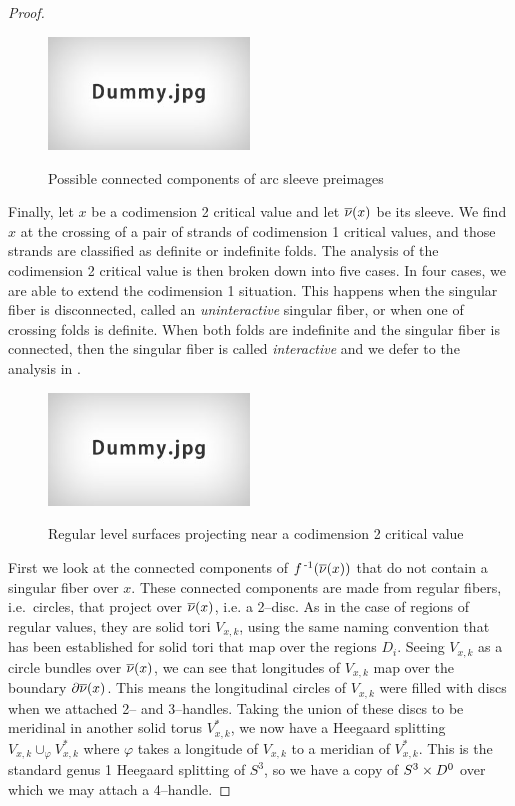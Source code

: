 \begin{proof}
	\begin{figure}
		\centering
		\captionsetup{justification=centering}
		\caption{Possible connected components of arc sleeve preimages}
		\includegraphics[height=3cm]{figures/dummy.jpg}
		\label{fig:arcsleevepre}
	\end{figure}
	
	Finally, let $x$ be a codimension 2 critical value and let $\overline{\nu}(x)$ be its sleeve.
	We find $x$ at the crossing of a pair of strands of codimension 1 critical values, and those strands are classified as definite or indefinite folds.
	The analysis of the codimension 2 critical value is then broken down into five cases.
	In four cases, we are able to extend the codimension 1 situation.
	This happens when the singular fiber is disconnected, called an \emph{uninteractive} singular fiber, or when one of crossing folds is definite.
	When both folds are indefinite and the singular fiber is connected, then the singular fiber is called \emph{interactive} and we defer to the analysis in \cite{CostThur08}.
	
	\begin{figure}
		\centering
		\captionsetup{justification=centering}
		\caption{Regular level surfaces projecting near a codimension 2 critical value}
		\includegraphics[height=3cm]{figures/dummy.jpg}
		\label{fig:regprojcodim2}
	\end{figure}
	
	First we look at the connected components of $f^{\,\text{-}1}(\overline{\nu}(x))$ that do not contain a singular fiber over $x$.
	These connected components are made from regular fibers, i.e.\ circles, that project over $\overline{\nu}(x)$, i.e. a 2--disc.
	As in the case of regions of regular values, they are solid tori $V_{x,k}$, using the same naming convention that has been established for solid tori that map over the regions $D_i$.
	Seeing $V_{x,k}$ as a circle bundles over $\overline{\nu}(x)$, we can see that longitudes of $V_{x,k}$ map over the boundary $\partial\overline{\nu}(x)$.
	This means the longitudinal circles of $V_{x,k}$ were filled with discs when we attached 2-- and 3--handles.
	Taking the union of these discs to be meridinal in another solid torus $V_{x,k}^*$, we now have a Heegaard splitting $V_{x,k}\cup_\varphi V_{x,k}^*$ where $\varphi$ takes a longitude of $V_{x,k}$ to a meridian of $V_{x,k}^*$.
	This is the standard genus 1 Heegaard splitting of $S^3$, so we have a copy of $S^3\times D^0$ over which we may attach a 4--handle.


\end{proof}
